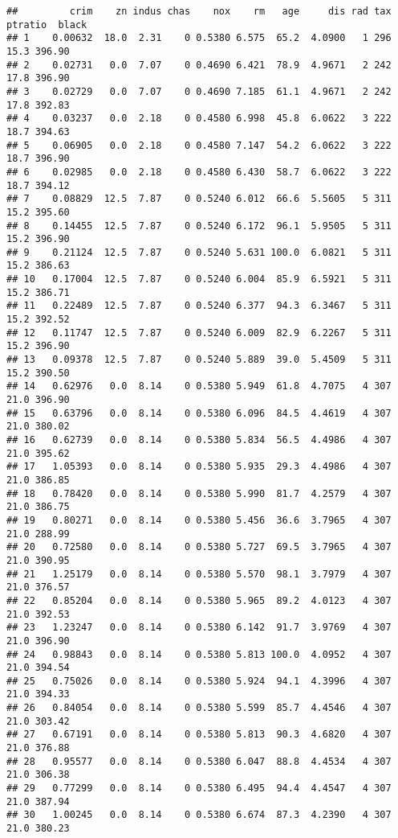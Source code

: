 \documentclass[
]{article}
\begin{document}
\begin{verbatim}
##         crim    zn indus chas    nox    rm   age     dis rad tax ptratio  black
## 1    0.00632  18.0  2.31    0 0.5380 6.575  65.2  4.0900   1 296    15.3 396.90
## 2    0.02731   0.0  7.07    0 0.4690 6.421  78.9  4.9671   2 242    17.8 396.90
## 3    0.02729   0.0  7.07    0 0.4690 7.185  61.1  4.9671   2 242    17.8 392.83
## 4    0.03237   0.0  2.18    0 0.4580 6.998  45.8  6.0622   3 222    18.7 394.63
## 5    0.06905   0.0  2.18    0 0.4580 7.147  54.2  6.0622   3 222    18.7 396.90
## 6    0.02985   0.0  2.18    0 0.4580 6.430  58.7  6.0622   3 222    18.7 394.12
## 7    0.08829  12.5  7.87    0 0.5240 6.012  66.6  5.5605   5 311    15.2 395.60
## 8    0.14455  12.5  7.87    0 0.5240 6.172  96.1  5.9505   5 311    15.2 396.90
## 9    0.21124  12.5  7.87    0 0.5240 5.631 100.0  6.0821   5 311    15.2 386.63
## 10   0.17004  12.5  7.87    0 0.5240 6.004  85.9  6.5921   5 311    15.2 386.71
## 11   0.22489  12.5  7.87    0 0.5240 6.377  94.3  6.3467   5 311    15.2 392.52
## 12   0.11747  12.5  7.87    0 0.5240 6.009  82.9  6.2267   5 311    15.2 396.90
## 13   0.09378  12.5  7.87    0 0.5240 5.889  39.0  5.4509   5 311    15.2 390.50
## 14   0.62976   0.0  8.14    0 0.5380 5.949  61.8  4.7075   4 307    21.0 396.90
## 15   0.63796   0.0  8.14    0 0.5380 6.096  84.5  4.4619   4 307    21.0 380.02
## 16   0.62739   0.0  8.14    0 0.5380 5.834  56.5  4.4986   4 307    21.0 395.62
## 17   1.05393   0.0  8.14    0 0.5380 5.935  29.3  4.4986   4 307    21.0 386.85
## 18   0.78420   0.0  8.14    0 0.5380 5.990  81.7  4.2579   4 307    21.0 386.75
## 19   0.80271   0.0  8.14    0 0.5380 5.456  36.6  3.7965   4 307    21.0 288.99
## 20   0.72580   0.0  8.14    0 0.5380 5.727  69.5  3.7965   4 307    21.0 390.95
## 21   1.25179   0.0  8.14    0 0.5380 5.570  98.1  3.7979   4 307    21.0 376.57
## 22   0.85204   0.0  8.14    0 0.5380 5.965  89.2  4.0123   4 307    21.0 392.53
## 23   1.23247   0.0  8.14    0 0.5380 6.142  91.7  3.9769   4 307    21.0 396.90
## 24   0.98843   0.0  8.14    0 0.5380 5.813 100.0  4.0952   4 307    21.0 394.54
## 25   0.75026   0.0  8.14    0 0.5380 5.924  94.1  4.3996   4 307    21.0 394.33
## 26   0.84054   0.0  8.14    0 0.5380 5.599  85.7  4.4546   4 307    21.0 303.42
## 27   0.67191   0.0  8.14    0 0.5380 5.813  90.3  4.6820   4 307    21.0 376.88
## 28   0.95577   0.0  8.14    0 0.5380 6.047  88.8  4.4534   4 307    21.0 306.38
## 29   0.77299   0.0  8.14    0 0.5380 6.495  94.4  4.4547   4 307    21.0 387.94
## 30   1.00245   0.0  8.14    0 0.5380 6.674  87.3  4.2390   4 307    21.0 380.23

\end{verbatim}
\end{document}
